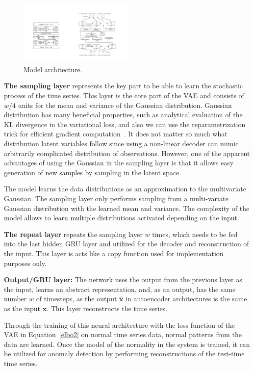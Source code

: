 \begin{figure}[!t]
\centerline{\includegraphics[width=0.5\textwidth]{gfx/chap4/modeltraining.pdf}}
\caption{Model architecture.}
\label{figmodeltraining}
\end{figure}

\textbf{The sampling layer} represents the key part to be able to learn the stochastic process of the time series. This layer is the core part of the VAE and consists of $w/4$ units for the mean and variance of the Gaussian distribution. Gaussian distribution has many beneficial properties, such as analytical evaluation of the KL divergence in the variational loss, and also we can use the reparametrization trick for efficient gradient computation~\cite{kingma2013auto}. It does not matter so much what distribution latent variables follow since using a non-linear decoder can mimic arbitrarily complicated distribution of observations. However, one of the apparent advantages of using the Gaussian in the sampling layer is that it allows easy generation of new samples by sampling in the latent space. 

The model learns the data distributions as an approximation to the multivariate Gaussian. The sampling layer only performs sampling from a multi-variate Gaussian distribution with the learned mean and variance. The complexity of the model allows to learn multiple distributions activated depending on the input.

\textbf{The repeat layer} repeats the sampling layer $w$ times, which needs to be fed into the last hidden GRU layer and utilized for the decoder and reconstruction of the input. This layer is acts like a copy function used for implementation purposes only.

\textbf{Output/GRU layer:} The network uses the output from the previous layer as the input, learns an abstract representation, and, as an output, has the same number $w$ of timesteps, as the output $\mathbf{\hat{x}}$ in autoencoder architectures is the same as the input $\mathbf{x}$. This layer reconstructs the time series.

Through the training of this neural architecture with the loss function of the VAE in Equation~\ref{elbo2} on normal time series data, normal patterns from the data are learned. Once the model of the normality in the system is trained, it can be utilized for anomaly detection by performing reconstructions of the test-time time series.

